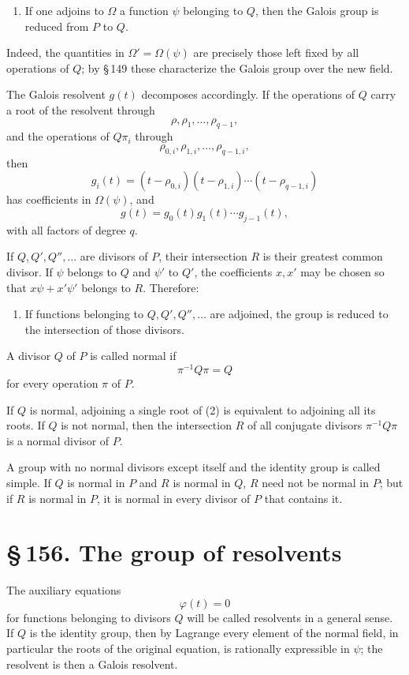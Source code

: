 \documentclass[11pt]{article}
\providecommand{\sect}[2]{\section*{\S\,#1. #2}}
\begin{document}
\begin{enumerate}[label=\arabic*.,leftmargin=2em,start=3]
\item If one adjoins to $\Omega$ a function $\psi$ belonging to $Q$, then the Galois group is reduced from $P$ to $Q$.
\end{enumerate}
Indeed, the quantities in $\Omega'=\Omega(\psi)$ are precisely those left fixed by all operations of $Q$; by \S\,149 these characterize the Galois group over the new field.

The Galois resolvent $g(t)$ decomposes accordingly. If the operations of $Q$ carry a root of the resolvent through
\[
        \rho,
\rho_1,
\ldots,
\rho_{q-1},
\]
and the operations of $Q\pi_i$ through
\[
        \rho_{0,i},
\rho_{1,i},
\ldots,
\rho_{q-1,i},
\]
then
\[
        g_i(t)=(t-\rho_{0,i})(t-\rho_{1,i})
\cdots(t-\rho_{q-1,i})
\]
has coefficients in $\Omega(\psi)$, and
\[
        g(t)=g_0(t)g_1(t)\cdots g_{j-1}(t),
\tag{6}
\]
with all factors of degree $q$.

If $Q,Q',Q'',\ldots$ are divisors of $P$, their intersection $R$ is their greatest common divisor. If $\psi$ belongs to $Q$ and $\psi'$ to $Q'$, the coefficients $x,x'$ may be chosen so that $x\psi+x'\psi'$ belongs to $R$. Therefore:
\begin{enumerate}[label=\arabic*.,leftmargin=2em,start=4]
\item If functions belonging to $Q,Q',Q'',\ldots$ are adjoined, the group is reduced to the intersection of those divisors.
\end{enumerate}

A divisor $Q$ of $P$ is called normal if
\[
        \pi^{-1}Q\pi=Q
\]
for every operation $\pi$ of $P$.

If $Q$ is normal, adjoining a single root of (2) is equivalent to adjoining all its roots. If $Q$ is not normal, then the intersection $R$ of all conjugate divisors $\pi^{-1}Q\pi$ is a normal divisor of $P$.

A group with no normal divisors except itself and the identity group is called simple. If $Q$ is normal in $P$ and $R$ is normal in $Q$, $R$ need not be normal in $P$; but if $R$ is normal in $P$, it is normal in every divisor of $P$ that contains it.

\sect{156}{The group of resolvents}

The auxiliary equations
\[
        \varphi(t)=0
\]
for functions belonging to divisors $Q$ will be called resolvents in a general sense. If $Q$ is the identity group, then by Lagrange every element of the normal field, in particular the roots of the original equation, is rationally expressible in $\psi$; the resolvent is then a Galois resolvent.
\end{document}
